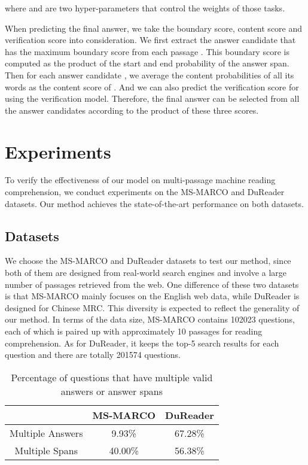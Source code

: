 \documentclass[11pt,a4paper]{article}
\begin{document}
where  and  are two hyper-parameters that control the weights of those tasks.

When predicting the final answer, we take the boundary score, content score and verification score into consideration. 
We first extract the answer candidate  that has the maximum boundary score from each passage . This boundary score is computed as the product of the start and end probability of the answer span. Then for each answer candidate , we average the content probabilities of all its words as the content score of . And we can also predict the verification score for  using the verification model. Therefore, the final answer can be selected from all the answer candidates according to the product of these three scores. 
  
\section{Experiments}
\label{experiments}

To verify the effectiveness of our model on multi-passage machine reading comprehension,
we conduct experiments on the MS-MARCO \cite{marco} and DuReader \cite{dureader} datasets. Our method achieves the state-of-the-art performance on both datasets.



\subsection{Datasets}
We choose the MS-MARCO and DuReader datasets to test our method, since both of them are designed from real-world search engines and involve a large number of passages retrieved from the web. One difference of these two datasets is that MS-MARCO mainly focuses on the English web data, while DuReader is designed for Chinese MRC. This diversity is expected to reflect the generality of our method. In terms of the data size, MS-MARCO contains 102023 questions, each of which is paired up with approximately 10 passages for reading comprehension. As for DuReader, it keeps the top-5 search results for each question and there are totally 201574 questions.  




\begin{table}[tbp]
\centering
\begin{tabular}{|c|c|c|}
\hline
                          & MS-MARCO & DuReader \\ \hline
Multiple Answers          &   9.93\%       &  67.28\%        \\
Multiple Spans &    40.00\%      &  56.38\%  \\\hline
\end{tabular}
\caption{Percentage of questions that have multiple valid answers or answer spans}
\label{tab:multi-answer}
\end{table}
\end{document}
